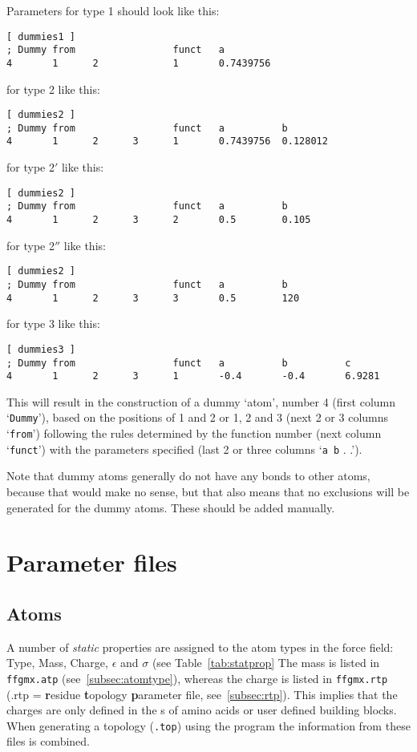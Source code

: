 Parameters for type 1 should look like this:
{\small\begin{verbatim}
[ dummies1 ]
; Dummy from                 funct   a
4       1      2             1       0.7439756
\end{verbatim}}

for type 2 like this:
{\small\begin{verbatim}
[ dummies2 ]
; Dummy from                 funct   a          b
4       1      2      3      1       0.7439756  0.128012
\end{verbatim}}

for type 2$'$ like this:
{\small\begin{verbatim}
[ dummies2 ]
; Dummy from                 funct   a          b
4       1      2      3      2       0.5        0.105
\end{verbatim}}

for type 2$''$ like this:
{\small\begin{verbatim}
[ dummies2 ]
; Dummy from                 funct   a          b
4       1      2      3      3       0.5        120
\end{verbatim}}

for type 3 like this:
{\small\begin{verbatim}
[ dummies3 ]
; Dummy from                 funct   a          b          c
4       1      2      3      1       -0.4       -0.4       6.9281
\end{verbatim}}

This will result in the construction of a dummy `atom', number 4
(first column `\verb'Dummy''), based on the positions of 1 and 2 or 1,
2 and 3 (next 2 or 3 columns `\verb'from'') following the rules
determined by the function number (next column `\verb'funct'') with
the parameters specified (last 2 or three columns `\verb'a b' . .').

Note that dummy atoms generally do not have any bonds to other atoms,
because that would make no sense, but that also means that no
exclusions will be generated for the dummy atoms. These should be
added manually.

\section{Parameter files}
\label{sec:paramfiles}
\subsection{Atoms}
A number of {\em static} properties are assigned to the atom types in the 
{\gromacs} force field: Type, Mass, Charge, $\epsilon$ and $\sigma$
(see Table~\ref{tab:statprop}
The mass is listed in \verb'ffgmx.atp' (see~\ref{subsec:atomtype}), 
whereas the charge is listed
in \verb'ffgmx.rtp' (.rtp = {\bf r}esidue {\bf t}opology {\bf
p}arameter file, see~\ref{subsec:rtp}). 
This implies that the charges are only defined
in the s 
of amino acids or user defined building blocks.
When generating a topology ({\tt *.top}) using the {\tt {}} 
program the information from these files is combined.
 
